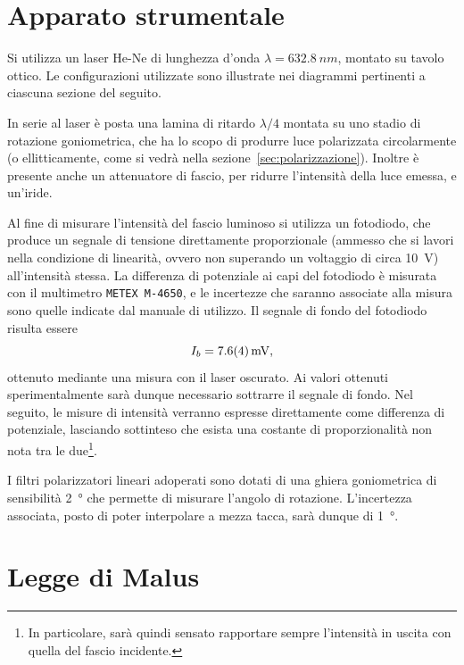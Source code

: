 \documentclass[10pt,oneside,a4paper]{article}
\begin{document}
\begin{multicols}{2}
\section{Apparato strumentale}

Si utilizza un laser He-Ne di lunghezza d'onda $\lambda = \SI{632.8}{nm}$, montato su tavolo ottico. Le configurazioni utilizzate sono illustrate nei diagrammi pertinenti a ciascuna sezione del seguito.

In serie al laser è posta una lamina di ritardo $\lambda / 4$ montata su uno stadio di rotazione goniometrica, che ha lo scopo di produrre luce polarizzata circolarmente (o ellitticamente, come si vedrà nella sezione~\ref{sec:polarizzazione}). Inoltre è presente anche un attenuatore di fascio, per ridurre l'intensità della luce emessa, e un'iride.

Al fine di misurare l'intensità del fascio luminoso si utilizza un fotodiodo, che produce un segnale di tensione direttamente proporzionale (ammesso che si lavori nella condizione di linearità, ovvero non superando un voltaggio di circa \SI{10}{V}) all'intensità stessa. La differenza di potenziale ai capi del fotodiodo è misurata con il multimetro \texttt{METEX M-4650}, e le incertezze che saranno associate alla misura sono quelle indicate dal manuale di utilizzo. Il segnale di fondo del fotodiodo risulta essere 
\[
I_b = \SI{7.6 \pm 0.4}{mV},
\]
ottenuto mediante una misura con il laser oscurato. Ai valori ottenuti sperimentalmente sarà dunque necessario sottrarre il segnale di fondo. Nel seguito, le misure di intensità verranno espresse direttamente come differenza di potenziale, lasciando sottinteso che esista una costante di proporzionalità non nota tra le due\footnote{In particolare, sarà quindi sensato rapportare sempre l'intensità in uscita con quella del fascio incidente.}.

I filtri polarizzatori lineari adoperati sono dotati di una ghiera goniometrica di sensibilità \SI{2}{\degree} che permette di misurare l'angolo di rotazione. L'incertezza associata, posto di poter interpolare a mezza tacca, sarà dunque di \SI{1}{\degree}.




\section{Legge di Malus}

\end{multicols}
\end{document}
